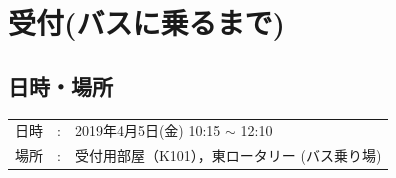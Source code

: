 %

\section{受付(バスに乗るまで)}


\subsection{日時・場所}

\begin{tabular}{p{}rp{}}
日時 & : & 2019年4月5日(金) 10:15 $\sim$ 12:10\\
場所 & : & 受付用部屋（K101），東ロータリー (バス乗り場)
\end{tabular}


